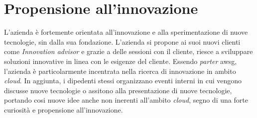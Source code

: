 \section{Propensione all'innovazione}
L'azienda è fortemente orientata all'innovazione e alla sperimentazione di nuove tecnologie, sin dalla sua fondazione.
L'azienda si propone ai suoi nuovi clienti come \textit{Innovation advisor} e grazie a delle sessioni con il cliente, riesce a sviluppare soluzioni innovative in linea con le esigenze del cliente. Essendo \textit{parter} \gls{awsg}, l'azienda è particolarmente incentrata nella ricerca di innovazione in ambito \textit{cloud}.
In aggiunta, i dipedenti stessi organizzano eventi interni in cui vengono discusse nuove tecnologie o assitono alla presentazione di nuove tecnologie, portando cosi nuove idee anche non inerenti all'ambito \textit{cloud}, segno di una forte curiosità e propensione all'innovazione.


    
    
    


